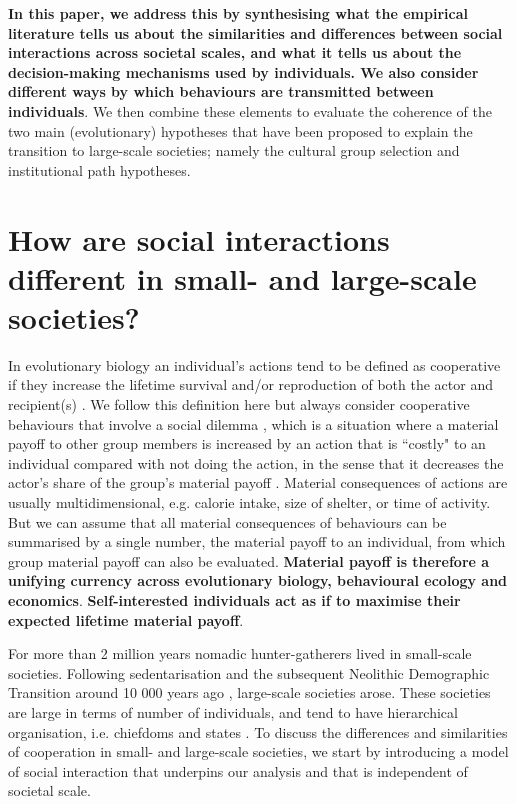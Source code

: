\documentclass[10pt, a4paper, fleqn]{article}
\begin{document}
\textbf{In this paper, we address this by synthesising what the empirical literature tells us about the similarities and differences between social interactions across societal scales, and what it tells us about the decision-making mechanisms used by individuals. We also consider different ways by which behaviours are transmitted between individuals}. We then combine these elements to evaluate the coherence of the two main (evolutionary) hypotheses that have been proposed to explain the transition to large-scale societies; namely the cultural group selection and institutional path hypotheses.

\section*{How are social interactions different in small- and large-scale societies?}

In evolutionary biology an individual's actions tend to be defined as cooperative if they increase the lifetime survival and/or reproduction of both the actor and recipient(s) \citep{Axelrod:1981:a,Rousset:2004:a,lehmannKellerFramework,Bshary07}. We follow this definition here but always consider cooperative behaviours that involve a social dilemma \citep{Kollock:1998:a}, which is a situation where a material payoff to other group members is increased by an action that is ``costly" to an individual compared with not doing the action, in the sense that it decreases the actor's share of the group's material payoff \citep{Dawes:1980:a}. Material consequences of actions are usually multidimensional, e.g. calorie intake, size of shelter, or time of activity. But we can assume that all material consequences of behaviours can be summarised by a single number, the material payoff to an individual, from which group material payoff can also be evaluated. \textbf{Material payoff is therefore a unifying currency across evolutionary biology, behavioural ecology and economics}. \textbf{Self-interested individuals act as if to maximise their expected lifetime material payoff}.

For more than 2 million years nomadic hunter-gatherers lived in small-scale societies. Following sedentarisation and the subsequent Neolithic Demographic Transition around 10 000 years ago \citep{Bocquet-Appel:2011:a}, large-scale societies arose. These societies are large in terms of number of individuals, and tend to have hierarchical organisation, i.e. chiefdoms and states \citep{Johnson:2000:a}. To discuss the differences and similarities of cooperation in small- and large-scale societies, we start by introducing a model of social interaction that underpins our analysis and that is independent of societal scale. 
\end{document}

